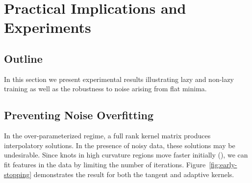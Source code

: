 \newpage
\newpage

\section{Practical Implications and Experiments}
\subsection{Outline}

In this section we present experimental results illustrating lazy and non-lazy training as well as the robustness to noise arising from flat minima.

\subsection{Preventing Noise Overfitting}
In the over-parameterized regime, a full rank kernel matrix produces interpolatory solutions. In the presence of noisy data, these solutions may be undesirable. Since knots in high curvature regions move faster initially (), we can fit features in the data by limiting the number of iterations. Figure~\ref{fig:early-stopping} demonstrates the result for both the tangent and adaptive kernels. 

